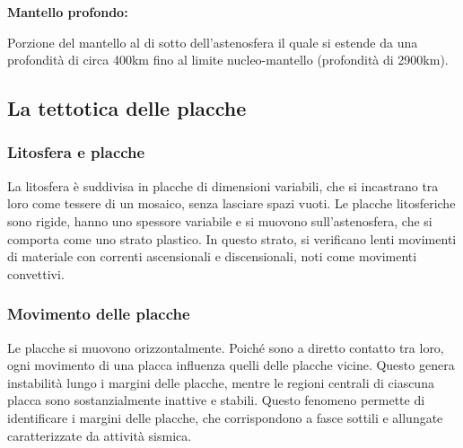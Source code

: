 \documentclass{article}
\begin{document}
\textbf{Mantello profondo:}

Porzione del mantello al di sotto dell'astenosfera il quale si estende da una profondità di
circa 400km fino al limite nucleo-mantello (profondità di 2900km).

\subsection{La tettotica delle placche}
\subsubsection{Litosfera e placche}
La litosfera è suddivisa in placche di dimensioni variabili, che si incastrano tra loro come
tessere di un mosaico, senza lasciare spazi vuoti. Le placche litosferiche sono rigide, hanno
uno spessore variabile e si muovono sull'astenosfera, che si comporta come uno strato plastico.
In questo strato, si verificano lenti movimenti di materiale con correnti ascensionali e
discensionali, noti come movimenti convettivi.

\begin{figure}[ht!]
    \begin{center}
    \end{center}
\end{figure}

\subsubsection{Movimento delle placche}
Le placche si muovono orizzontalmente. Poiché sono a diretto contatto tra loro, ogni movimento
di una placca influenza quelli delle placche vicine. Questo genera instabilità lungo i margini
delle placche, mentre le regioni centrali di ciascuna placca sono sostanzialmente inattive e
stabili. Questo fenomeno permette di identificare i margini delle placche, che corrispondono a
fasce sottili e allungate caratterizzate da attività sismica.
\end{document}
